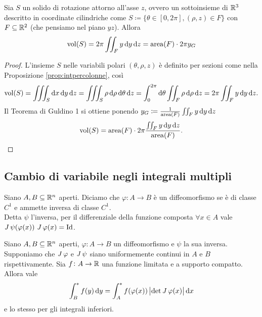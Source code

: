 \begin{thm}
	Sia $ S $ un solido di rotazione attorno all'asse $ z $, ovvero un sottoinsieme di $ \mathbb{R}^3 $ descritto in coordinate cilindriche come $ S \coloneqq \{\theta \in [0, 2\pi], (\rho, z) \in F\} $ con $ F \subseteq \mathbb{R}^2 $ (che pensiamo nel piano $ yz $). Allora
	\begin{equation}
		\mathrm{vol}(S) = 2\pi \iint_F y \dif{y} \dif{z} = \mathrm{area}(F) \cdot 2\pi y_G
	\end{equation}
\end{thm}
\begin{center}
\begin{proof}
	L'insieme $ S $ nelle variabili polari $ (\theta, \rho, z) $ è definito per sezioni come nella Proposizione \ref{prop:intpercolonne}, così
	\[
		\mathrm{vol}(S) = \iiint_S \dif{x} \dif{y} \dif{z} = \iiint_S \rho \dif{\rho} \dif{\theta} \dif{z} = \int_{0}^{2\pi} \dif{\theta} \iint_{F} \rho \dif{\rho} \dif{z} = 2\pi \iint_F y \dif{y} \dif{z}.
	\]
	Il Teorema di Guldino 1 si ottiene ponendo $ y_G \coloneqq \frac{1}{\mathrm{area}(F)} \iint_F y \dif{y} \dif{z} $
	\[
		\mathrm{vol}(S) =	\mathrm{area}(F) \cdot 2\pi \frac{\iint_F y \dif{y} \dif{z}}{\mathrm{area}(F)}. \qedhere
	\]
\end{proof}

\end{center}
\subsection{Cambio di variabile negli integrali multipli}

\begin{definition}[diffeomorfismo]
	Siano $ A, B \subseteq \mathbb{R}^n $ aperti. Diciamo che $ \varphi \colon A \to B $ è un diffeomorfismo se è di classe $ C^1 $ e ammette inversa di classe $ C^1 $. \\
	Detta $ \psi $ l'inversa, per il differenziale della funzione composta $ \forall x \in A $ vale $ \operatorname{\mathit{J}}{\psi}(\varphi(x)) \, \operatorname{\mathit{J}}{\varphi(x)} = \mathrm{Id} $.
\end{definition}

\begin{thm}
	Siano $ A, B \subseteq \mathbb{R}^n $ aperti, $ \varphi \colon A \to B $ un diffeomorfismo e $ \psi $ la sua inversa. Supponiamo che $ \operatorname{\mathit{J}}{\varphi} $ e $ \operatorname{\mathit{J}}{\psi} $ siano uniformemente continui in $ A $ e $ B $ rispettivamente. Sia $ f \colon A \to \mathbb{R} $ una funzione limitata e a supporto compatto. Allora vale 
	\begin{equation}
		\int_{B}^{*} f(y) \dif{y} = \int_{A}^{*} f(\varphi(x)) \, \abs{\det{\jac{\varphi}(x)}} \dif{x}
	\end{equation}
	e lo stesso per gli integrali inferiori.
\end{thm}

